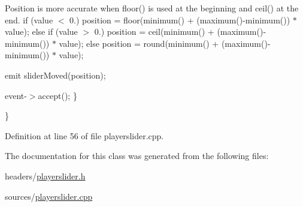 Position is more accurate when floor() is used at the beginning and ceil() at the end. if (value $<$ 0.) position = floor(minimum() + (maximum()-\/minimum()) $\ast$ value); else if (value $>$ 0.) position = ceil(minimum() + (maximum()-\/minimum()) $\ast$ value); else position = round(minimum() + (maximum()-\/minimum()) $\ast$ value);

emit slider\+Moved(position);

event-\/$>$accept(); \}

\} 

Definition at line 56 of file playerslider.\+cpp.



The documentation for this class was generated from the following files\+:\begin{DoxyCompactItemize}
\item 
headers/\hyperlink{playerslider_8h}{playerslider.\+h}\item 
sources/\hyperlink{playerslider_8cpp}{playerslider.\+cpp}\end{DoxyCompactItemize}
